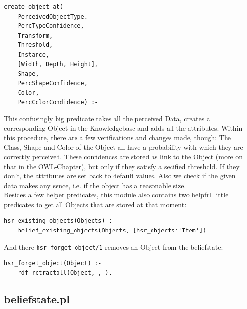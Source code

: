 \documentclass[main.tex]{subfiles}
\begin{document}
\begin{lstlisting}
create_object_at(
	PerceivedObjectType, 
	PercTypeConfidence, 
	Transform, 
	Threshold, 
	Instance, 
	[Width, Depth, Height], 
	Shape, 
	PercShapeConfidence, 
	Color, 
	PercColorCondidence) :-
\end{lstlisting}
This confusingly big predicate takes all the perceived Data, creates a corresponding Object in the Knowledgebase and adds all the attributes. Within this procedure, there are a few verifications and changes made, though: The Class, Shape and Color of the Object all have a probability with which they are correctly perceived. These confidences are stored as link to the Object (more on that in the OWL-Chapter), but only if they satisfy a secified threshold. If they don't, the attributes are set back to default values. Also we check if the given data makes any sence, i.e. if the object has a reasonable size.\\
Besides a few helper predicates, this module also contains two helpful little predicates to get all Objects that are stored at that moment:
\begin{lstlisting}
hsr_existing_objects(Objects) :-
    belief_existing_objects(Objects, [hsr_objects:'Item']).
\end{lstlisting}
And there \texttt{hsr\_forget\_object/1} removes an Object from the beliefstate:
\begin{lstlisting}
hsr_forget_object(Object) :-
    rdf_retractall(Object,_,_).
\end{lstlisting}

\subsection{beliefstate.pl}
\end{document}
